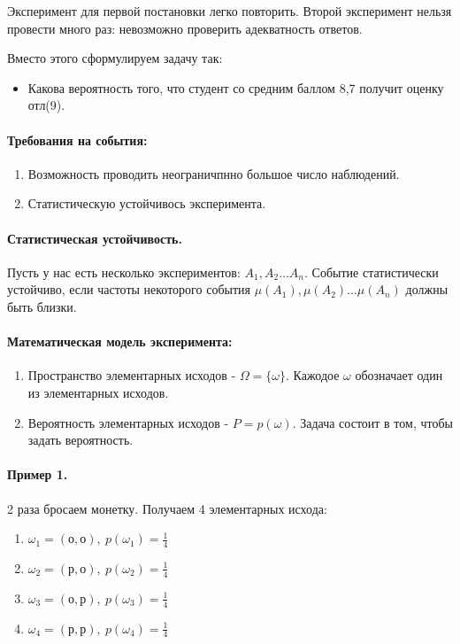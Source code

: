 \documentclass{article}
\begin{document}
  Эксперимент для первой постановки легко повторить. Второй эксперимент нельзя провести много раз: невозможно проверить адекватность ответов.
  
  Вместо этого сформулируем задачу так:
  \begin{itemize}
  \item Какова вероятность того, что студент со средним баллом 8,7 получит оценку отл(9).
  \end{itemize}
  
  \paragraph*{Требования на события:}
  \begin{enumerate}
  \item Возможность проводить неограничпнно большое число наблюдений.
  \item Статистическую устойчивось эксперимента.
  \end{enumerate}
  
  \paragraph{Статистическая устойчивость.} Пусть у нас есть несколько экспериментов: $ A_1, A_2 \ldots A_n $. Событие статистически устойчиво, если частоты некоторого события $ \mu(A_1), \mu(A_2) \ldots \mu(A_n) $ должны быть близки. 
  
  \paragraph*{Математическая модель эксперимента:}
  \begin{enumerate}
  \item Пространство элементарных исходов - $ \Omega = \{\omega\} $. Кажодое $\omega$ обозначает один из элементарных исходов. 
  \item Вероятность элементарных исходов - $ P = p(\omega) $. Задача состоит в том, чтобы задать вероятность.
  \end{enumerate}
  
  \paragraph*{Пример 1.} 2 раза бросаем монетку. Получаем 4 элементарных исхода: 
  \begin{enumerate}
  \item $ \omega_1 = (\text{о}, \text{о}),~ p(\omega_1) = \frac{1}{4} $
  \item $ \omega_2 = (\text{р}, \text{о}),~ p(\omega_2) = \frac{1}{4} $
  \item $ \omega_3 = (\text{о}, \text{р}),~ p(\omega_3) = \frac{1}{4} $
  \item $ \omega_4 = (\text{р}, \text{р}),~ p(\omega_4) = \frac{1}{4} $
  \end{enumerate}
  
\end{document}
